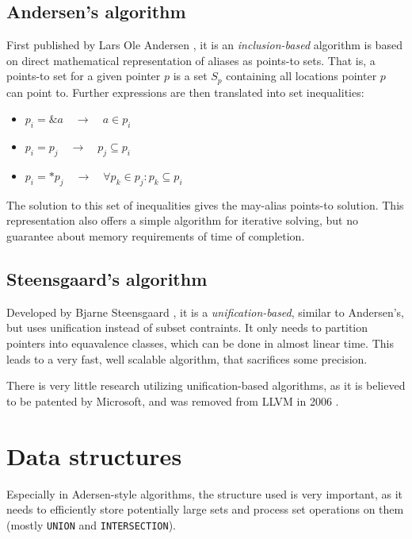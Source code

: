 \subsection{Andersen's algorithm}

First published by Lars Ole Andersen \cite{Andersen94}, it is an {\it
inclusion-based} algorithm is based on direct mathematical representation of
aliases as points-to sets. That is, a points-to set for a given pointer $p$ is a
set $S_p$ containing all locations pointer $p$ can point to.  Further
expressions are then translated into set inequalities:

\begin{itemize}
	\item $p_i = \&a \quad \to \quad a \in p_i$
	\item $p_i = p_j \quad \to \quad p_j \subseteq p_i$ 
	\item $p_i = *p_j \quad \to \quad \forall p_k \in p_j : p_k \subseteq p_i$
\end{itemize}

The solution to this set of inequalities gives the may-alias points-to
solution. This representation also offers a simple algorithm for iterative
solving, but no guarantee about memory requirements of time of completion.

\subsection{Steensgaard's algorithm}

Developed by Bjarne Steensgaard \cite{Steensgaard96}, it is  a {\it
unification-based}, similar to Andersen's, but uses unification instead of
subset contraints. It only needs to partition pointers into equavalence
classes, which can be done in almost linear time. This leads to a very fast,
well scalable algorithm, that sacrifices some precision.

There is very little research utilizing unification-based algorithms, as it is
believed to be patented by Microsoft, and was removed from LLVM in 2006
\cite{LLVM:DSA:Remove}.


\section{Data structures}

Especially in Adersen-style algorithms, the structure used is very important, as
it needs to efficiently store potentially large sets and process set operations
on them (mostly {\tt UNION} and {\tt INTERSECTION}).

